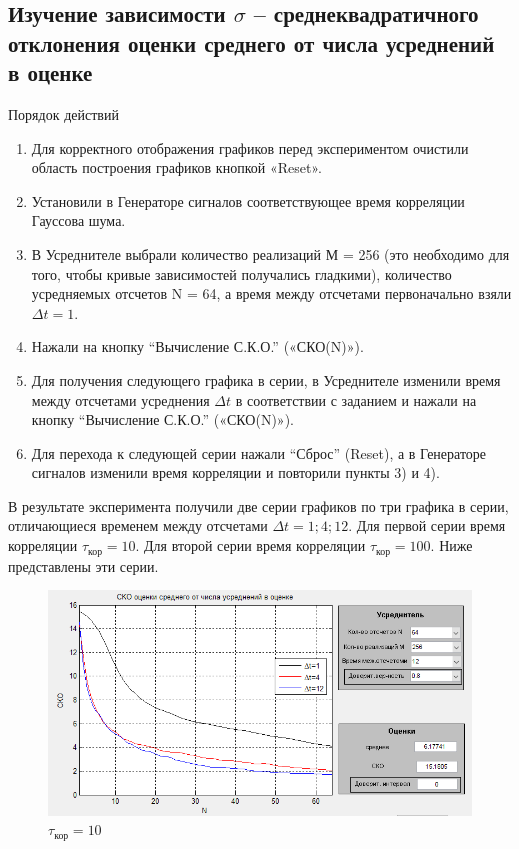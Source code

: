 \subsection[Задание 3]{Изучение зависимости $\sigma$ -- среднеквадратичного отклонения оценки среднего от числа усреднений в оценке}
Порядок действий
\begin{enumerate}
	\item Для корректного отображения графиков перед экспериментом очистили область построения графиков кнопкой «Reset».
	\item Установили в Генераторе сигналов соответствующее время корреляции Гауссова шума.
	\item В Усреднителе выбрали количество реализаций М = 256 (это необходимо для того, чтобы кривые зависимостей получались гладкими), количество усредняемых отсчетов N = 64, а время между отсчетами первоначально взяли $\Delta t = 1$.
	\item Нажали на кнопку “Вычисление С.К.О.” («СКО(N)»).
	\item Для получения следующего графика в серии, в Усреднителе изменили время между отсчетами усреднения $\Delta t$ в соответствии с заданием и нажали на кнопку “Вычисление С.К.О.” («СКО(N)»).
	\item Для перехода к следующей серии нажали “Сброс” (Reset), а в Генераторе сигналов изменили время корреляции и повторили пункты 3) и 4).
\end{enumerate}
В результате эксперимента получили две серии графиков по три графика в серии, отличающиеся временем между отсчетами $\Delta t=1; 4; 12$.
Для первой серии время корреляции $\tau_\text{кор} = 10$. Для второй серии время корреляции $\tau_\text{кор} = 100$.
Ниже представлены эти серии.
\begin{figure}[H]
	\centering
    \includegraphics[width=0.85\linewidth]{fig/fig31}
	\caption*{$\tau_\text{кор} = 10$}
\end{figure}

